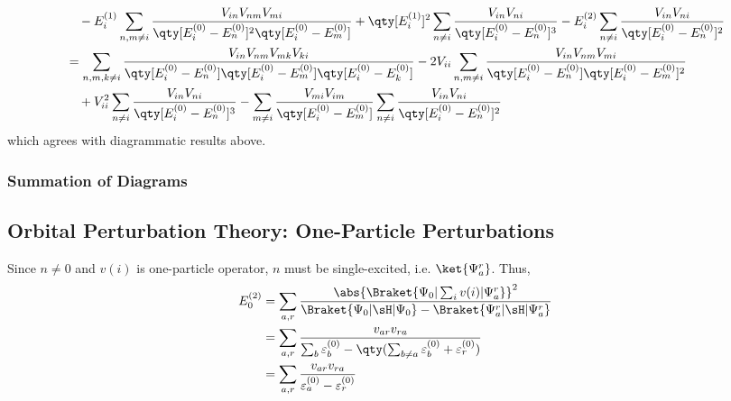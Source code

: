 \documentclass[a4paper]{article}
\begin{document}
\begin{align}
&{}\quad- E_i^{(1)} \sum_{n,m\neq i} \dfrac{V_{in}V_{nm}V_{mi} }{\qty[E_i^{(0)} - E_n^{(0)}]^2\qty[E_i^{(0)} - E_m^{(0)}]} 
 +  \qty[E_i^{(1)}]^2 \sum_{n\neq i} \dfrac{V_{in}V_{ni}}{\qty[E_i^{(0)} - E_n^{(0)}]^3} 
-  E_i^{(2)} \sum_{n\neq i} \dfrac{V_{in}V_{ni}}{\qty[E_i^{(0)} - E_n^{(0)}]^2} \notag\\
&= \sum_{n,m,k\neq i} \dfrac{V_{in} V_{nm}V_{mk}V_{ki}}{\qty[E_i^{(0)} - E_n^{(0)}]\qty[E_i^{(0)} - E_m^{(0)}]\qty[E_i^{(0)} - E_k^{(0)}]} 
- 2V_{ii}\sum_{n,m\neq i} \dfrac{V_{in} V_{nm} V_{mi}}{\qty[E_i^{(0)} - E_n^{(0)}]\qty[E_i^{(0)} - E_m^{(0)}]^2}  \notag\\
&{}\quad %
+  V_{ii}^2 \sum_{n\neq i} \dfrac{V_{in}V_{ni}}{\qty[E_i^{(0)} - E_n^{(0)}]^3} 
-  \sum_{m\neq i} \dfrac{V_{mi}V_{im}}{\qty[E_i^{(0)} - E_m^{(0)}]} \sum_{n\neq i} \dfrac{V_{in}V_{ni}}{\qty[E_i^{(0)} - E_n^{(0)}]^2} 
\end{align}
which agrees with diagrammatic results above.

\subsubsection{Summation of Diagrams}

\newpage
\subsection{Orbital Perturbation Theory: One-Particle Perturbations}
Since $ n\neq 0 $ and $ v(i) $ is one-particle operator, $ n $ must be single-excited, i.e. $ \ket{\Psi_a^r} $. Thus,
\begin{align}
E_0^{(2)} &= \sum_{a,r} \dfrac{\abs{\Braket{\Psi_0 | \sum_i v(i) | \Psi_a^r}}^2}{\Braket{\Psi_0 | \sH | \Psi_0} - \Braket{\Psi_a^r| \sH | \Psi_a^r}} \notag\\
&= \sum_{a,r} \dfrac{v_{ar} v_{ra}}{\sum_b \varepsilon_b^{(0)} - \qty(\sum_{b\neq a}\varepsilon_b^{(0)} + \varepsilon_r^{(0)})} \notag\\
&= \sum_{a,r} \dfrac{v_{ar} v_{ra}}{\varepsilon_a^{(0)} - \varepsilon_r^{(0)}}
\end{align}
\end{document}

